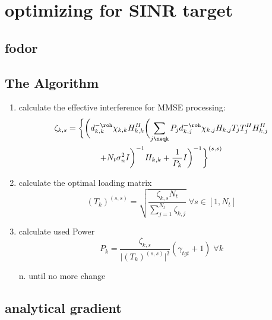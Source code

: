 \section{optimizing for SINR target}
\subsection{fodor}

\subsection{The Algorithm}
\begin{enumerate}
	\item calculate the effective interference for MMSE processing:
		\begin{multline}
			\zeta_{k,s} = \biggl\{\biggl(d^{-\roh}_{k,k}\chi_{k,k}H^H_{k,k}\biggl(\sum_{j\neqk}{P_jd^{-\roh}_{k,j}\chi_{k,j}H_{k,j}T_jT_j^HH^H_{k,j}}\\
			+N_t\sigma^2_nI\biggr)^{-1}H_{k,k}+\frac{1}{P_k}I\biggr)^{-1}\biggr\}^{(s,s)}
		\end{multline}

	\item calculate the optimal loading matrix
		\begin{equation}
			(T_k)^{(s,s)} = \sqrt{\frac{\zeta_{k,s}N_t}{\sum_{j=1}^{N_t}\zeta_{k,j}}}\;\forall s\in[1,N_t]
		\end{equation}

	\item calculate used Power
		\begin{equation}
			P_k = \frac{\zeta_{k,s}}{\vert(T_k)^{(s,s)}\vert^2}(\gamma_{tgt}+1)\;\forall k
		\end{equation}

	\item[n.] until no more change

\end{enumerate}

\subsection{analytical gradient}
